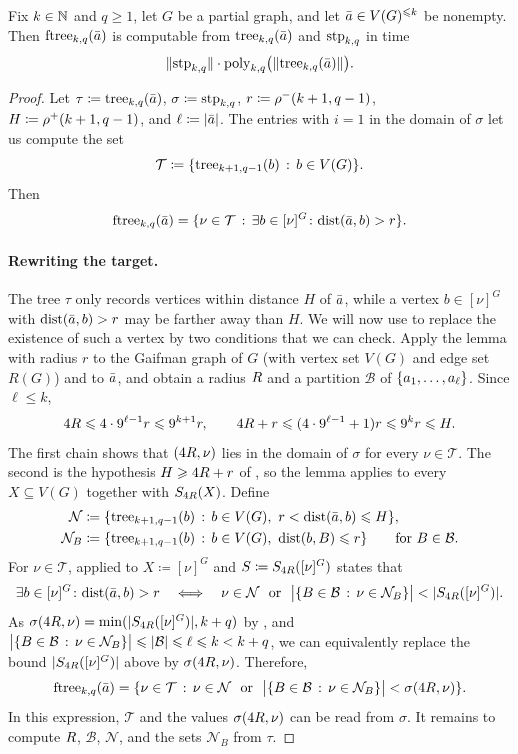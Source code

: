 \begin{lemma}\label{lem:to-ftree}
Fix $k\in\mathbb N$ and $q\ge1$, let $G$ be a partial graph, and let $\bar a\in V(G)^{\leqslant k}$ be nonempty.
Then $\textnormal{ftree}_{k,q}(\bar a)$ is computable from $\mathrm{tree}_{k,q}(\bar a)$ and $\textnormal{stp}_{k,q}$ in time
\[
\lVert \textnormal{stp}_{k,q}\rVert\cdot
\mathrm{poly}_{k,q}\bigl(\lVert \mathrm{tree}_{k,q}(\bar a)\rVert\bigr).
\]
\end{lemma}
\begin{proof}
Let
$\tau\coloneqq\mathrm{tree}_{k,q}(\bar a)$,
$\sigma\coloneqq\textnormal{stp}_{k,q}$,
$r\coloneqq\rho^-(k+1,q-1)$,
$H\coloneqq\rho^+(k+1,q-1)$, and
$\ell\coloneqq|\bar a|$.
The entries with $i=1$ in the domain of $\sigma$ let us compute the set
\[
\mathcal T
\coloneqq
\{\mathrm{tree}_{k+1,q-1}(b) \,:\, b\in V(G) \}.
\]
Then
\[
\textnormal{ftree}_{k,q}(\bar a) =\{\nu\in\mathcal T \,:\, \exists b\in[\nu]^G\colon\mathrm{dist}(\bar a,b)>r \}.
\]


\paragraph{Rewriting the target.}
The tree $\tau$ only records vertices within distance $H$ of $\bar a$, while a vertex $b\in[\nu]^G$ with $\mathrm{dist}(\bar a,b)>r$ may be farther away than $H$.
We will now use  to replace the existence of such a vertex by two conditions that we can check.
Apply the lemma with radius $r$ to the Gaifman graph of $G$ (with vertex set $V(G)$ and edge set $R(G)$) and to $\bar a$, and obtain a radius $R$ and a partition $\mathcal B$ of $\{a_1,\ldots,a_\ell\}$.
Since $\ell\le k$,
\[
4R\leqslant4\cdot9^{\ell-1}r\leqslant9^{k+1}r,
\qquad
4R+r\leqslant(4\cdot9^{\ell-1}+1)r\leqslant9^{k}r\leqslant H.
\]
The first chain shows that $(4R,\nu)$ lies in the domain of $\sigma$ for every $\nu\in\mathcal T$. The second is the hypothesis $H\geqslant4R+r$ of , so the lemma applies to every $X\subseteq V(G)$ together with $S_{4R}(X)$.
Define
\begin{align*}
\mathcal N&\coloneqq\setof{\tree_{k+1,q-1}(b)}{b\in V(G),\ r<\dist(\tup a,b)\le H},\\
\mathcal N_B&\coloneqq\setof{\tree_{k+1,q-1}(b)}{b\in V(G),\ \dist(b,B)\le r}
\qquad\text{for $B\in\mathcal B$.}
\end{align*}
For $\nu\in\mathcal T$,  applied to $X\coloneqq[\nu]^G$ and $S\coloneqq S_{4R}([\nu]^G)$ states that
\[
\exists b\in[\nu]^G\colon\dist(\tup a,b)>r
\quad\Longleftrightarrow\quad
\nu\in\mathcal N\ \text{ or }\ \bigl|\setoff{B\in\mathcal B}{\nu\in\mathcal N_B}\bigr|<|S_{4\crad}([\nu]^G)|.
\]
As $\sigma(4R,\nu)=\min(|S_{4R}([\nu]^G)|,k+q)$ by , and $\bigl|\{B\in\mathcal B \,:\, \nu\in\mathcal N_B \}\bigr|\leqslant|\mathcal B|\leqslant\ell\leqslant k<k+q$, we can equivalently replace the bound $|S_{4R}([\nu]^G)|$ above by $\sigma(4R,\nu)$.
Therefore,
\[
\ftree_{k,q}(\tup a)
=\setoff{\nu\in\mathcal T}{\nu\in\mathcal N\ \text{ or }\ \bigl|\setoff{B\in\mathcal B}{\nu\in\mathcal N_B}\bigr|<\sigma(4\crad,\nu)}.
\]
In this expression, $\mathcal T$ and the values $\sigma(4R,\nu)$ can be read from $\sigma$.
It remains to compute $R$, $\mathcal B$, $\mathcal N$, and the sets $\mathcal N_B$ from $\tau$.


\end{proof}
